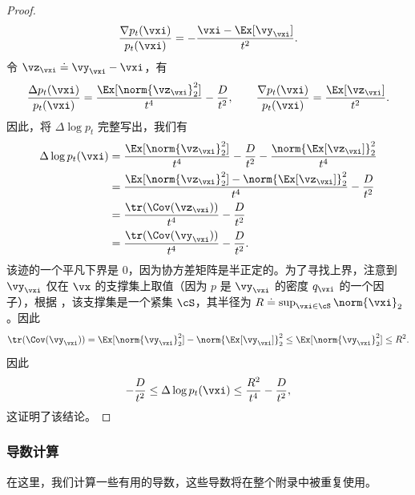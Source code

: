 \documentclass[../../book-main_zh.tex]{subfiles}
\begin{document}
\begin{proof}
\begin{equation}
        \frac{\nabla p_{t}(\vxi)}{p_{t}(\vxi)} = -\frac{\vxi -
        \Ex[\vy_{\vxi}]}{t^{2}}.
    \end{equation}
    令 \(\vz_{\vxi} \doteq \vy_{\vxi} - \vxi\)，有
    \begin{equation}
        \frac{\Delta p_{t}(\vxi)}{p_{t}(\vxi)} =
        \frac{\Ex[\norm{\vz_{\vxi}}_{2}^{2}]}{t^{4}} -
        \frac{D}{t^{2}}, \qquad \frac{\nabla
        p_{t}(\vxi)}{p_{t}(\vxi)} = \frac{\Ex[\vz_{\vxi}]}{t^{2}}.
    \end{equation}
    因此，将 \(\Delta \log p_{t}\) 完整写出，我们有
    \begin{align}
        \Delta \log p_{t}(\vxi)
        &= \frac{\Ex[\norm{\vz_{\vxi}}_{2}^{2}]}{t^{4}} -
        \frac{D}{t^{2}} - \frac{\norm{\Ex[\vz_{\vxi}]}_{2}^{2}}{t^{4}} \\
        &= \frac{\Ex[\norm{\vz_{\vxi}}_{2}^{2}] -
        \norm{\Ex[\vz_{\vxi}]}_{2}^{2}}{t^{4}} - \frac{D}{t^{2}} \\
        &= \frac{\tr(\Cov(\vz_{\vxi}))}{t^{4}} - \frac{D}{t^{2}} \\
        &= \frac{\tr(\Cov(\vy_{\vxi}))}{t^{4}} - \frac{D}{t^{2}}.
    \end{align}
    该迹的一个平凡下界是 \(0\)，因为协方差矩阵是半正定的。为了寻找上界，注意到 \(\vy_{\vxi}\) 仅在 \(\vx\) 的支撑集上取值（因为 \(p\) 是 \(\vy_{\vxi}\) 的密度 \(q_{\vxi}\) 的一个因子），根据 ，该支撑集是一个紧集 \(\cS\)，其半径为 \(R \doteq \sup_{\vxi \in \cS}\norm{\vxi}_{2}\)。因此
    \begin{equation}
        \tr(\Cov(\vy_{\vxi})) = \Ex[\norm{\vy_{\vxi}}_{2}^{2}] -
        \norm{\Ex[\vy_{\vxi}]}_{2}^{2} \leq
        \Ex[\norm{\vy_{\vxi}}_{2}^{2}] \leq R^{2}.
    \end{equation}
    因此
    \begin{equation}
        -\frac{D}{t^{2}} \leq \Delta \log p_{t}(\vxi) \leq
        \frac{R^{2}}{t^{4}} - \frac{D}{t^{2}},
    \end{equation}
    这证明了该结论。
\end{proof}

\subsubsection{导数计算}

在这里，我们计算一些有用的导数，这些导数将在整个附录中被重复使用。
\end{document}
